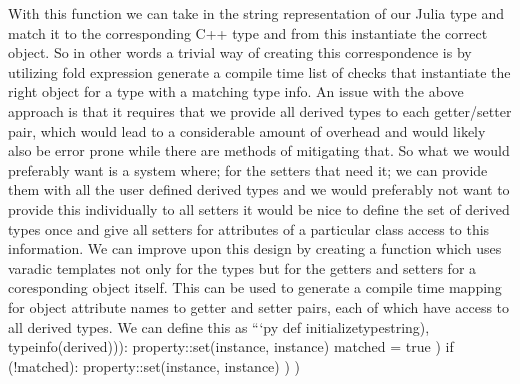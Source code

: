 {}With this function we can take in the string representation of our Julia type and match it to the corresponding C++ type and from this instantiate the correct object.\markdownRendererInterblockSeparator
{}So in other words a trivial way of creating this correspondence is by utilizing fold expression generate a compile time list of checks that instantiate the right object for a type with a matching type info.\markdownRendererInterblockSeparator
{}\markdownRendererInterblockSeparator
{}An issue with the above approach is that it requires that we provide all derived types to each getter/setter pair, which would lead to a considerable amount of overhead and would likely also be error prone while there are methods of mitigating that. \markdownRendererInterblockSeparator
{}So what we would preferably want is a system where; for the setters that need it; we can provide them with all the user defined derived types and we would preferably not want to provide this individually to all setters it would be nice to define the set of derived types once and give all setters for attributes of a particular class access to this information. \markdownRendererInterblockSeparator
{}\markdownRendererInterblockSeparator
{}We can improve upon this design by creating a function which uses varadic templates not only for the types but for the getters and setters for a coresponding object itself. This can be used to generate a compile time mapping for object attribute names to getter and setter pairs, each of which have access to all derived types. We can define this as \markdownRendererInterblockSeparator
{}```py def initializetype\markdownRendererUnderscore{}string), typeinfo(derived))): property::set(instance, instance) matched = true ) if (!matched): property::set(instance, instance) \markdownRendererRightBrace{} \markdownRendererRightBrace{} ) )\markdownRendererInterblockSeparator

